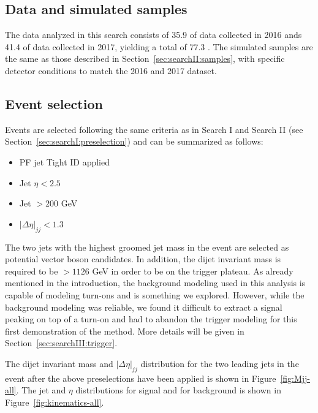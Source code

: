 \subsection{Data and simulated samples}
The data analyzed in this search consists of 35.9 \fbinv of data collected in 2016 ands 41.4 \fbinv of data collected in 2017, yielding a total of 77.3 \fbinv.\newline
The simulated samples are the same as those described in Section~\ref{sec:searchII:samples}, with specific detector conditions to match the 2016 and 2017 dataset.

\subsection{Event selection}
Events are selected following the same criteria as in Search I and Search II (see Section~\ref{sec:searchI:preselection}) and can be summarized as follows:
\begin{itemize}
    \itemsep0em 
\item PF jet Tight ID applied
\item Jet $\eta < 2.5$
\item Jet \pt $> 200$ GeV
\item $|\Delta\eta|_{jj} < 1.3$
\end{itemize} 
The two jets with the highest groomed jet mass in the event are selected as potential vector boson candidates. In addition, the dijet invariant mass is required to be $> 1126$ GeV in order to be on the trigger plateau.
As already mentioned in the introduction, the background modeling used in this analysis is capable of modeling turn-ons and is something we explored. However, while the background modeling was reliable, we found it difficult to extract a signal peaking on top of a turn-on and had to abandon the trigger modeling for this first demonstration of the method. More details will be given in Section~\ref{sec:searchIII:trigger}.\newline 

The dijet invariant mass and $|\Delta\eta|_{jj}$ distribution for the two leading jets in the event after the above preselections have been applied is shown in Figure~\ref{fig:Mjj-all}. The jet \PT{} and $\eta$ distributions for signal and for background is shown in Figure~\ref{fig:kinematics-all}. 

